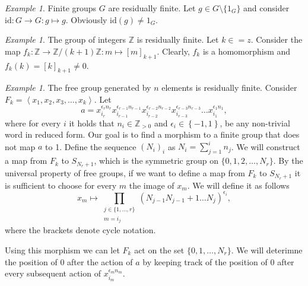 \documentclass[titlepage, a4paper]{article}
\newcommand{\Z}{\mathbb{Z}}
\newcommand{\id}{\mathrm{id}}
\theoremstyle{definition}
\theoremstyle{remark}
\newtheorem{example}[theorem]{Example}
\begin{document}
\begin{example}
	Finite groups $G$ are residually finite. Let $g \in G \setminus \{1_G\}$ and consider $\id: G \to G: g \mapsto g$. Obviously $\id(g) \neq 1_G$.
\end{example}


\begin{example}
	The group of integers $\mathbb Z$ is residually finite. Let $k \in \mathbb =z$. Consider the map $f_k: \mathbb Z \to \mathbb Z/(k+1)\mathbb Z: m \mapsto [m]_{k+1}$. Clearly, $f_k$ is a homomorphism and $f_k(k) = [k]_{k+1} \neq 0$.
\end{example}

\begin{example}\label{ex:free_group_residually_finite}
	The free group generated by $n$ elements is residually finite. 
	Consider $F_k = \left<x_1, x_2, x_3, \ldots, x_k \right>$.  %
Let \[
a = x_{i_r}^{\epsilon_r n_r}x_{i_{r-1}}^{\epsilon_{r-1}n_{r-1}}x_{i_{r-2}}^{\epsilon_{r-2}n_{r-2}}x_{i_{r-3}}^{\epsilon_{r-3}n_{r-3}} \ldots x_{i_1}^{\epsilon_1n_1}
,\]
where for every $i$ it holds that $n_i \in \Z_{>0}$ and $\epsilon_i \in \left\{ -1,1 \right\} $, be any non-trivial word in reduced form. 
Our goal is to find a morphism to a finite group that does not map $a$ to 1. 
Define the sequence $(N_i)_i$ as $N_i = \sum_{j = 1}^{i} n_j$. 
We will construct a map from $F_k$ to $S_{N_r + 1}$, which is the symmetric group on $\{0,1, 2, \ldots, N_{r}\} $.   %
By the universal property of free groups, if we want to define a map from $F_k$ to $S_{N_r +1}$ it is sufficient to choose for every $m$ the image of $x_m$.
We will define it as follows
\[
x_m \mapsto \prod_{\substack{j \in \{1,\ldots, r\} \\ m = i_j} } (N_{j-1} N_{j-1}+1 \ldots N_{j})^{\epsilon_i} %
,\] 
where the brackets denote cycle notation.

Using this morphism we can let $F_k$ act on the set $\{0,1,\ldots, N_r\} $. 
We will deterimne the position of $0$ after the action of $a$ by keeping track of the position of $0$ after every subsequent  action of  $x_{i_m}^{\epsilon_m n_m}$.


\end{example}
\end{document}
